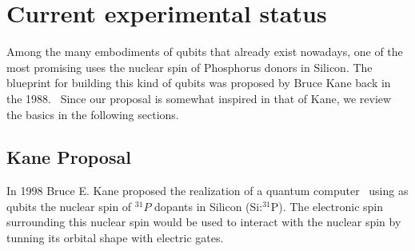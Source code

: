 \chapter{Current experimental status}
Among the many embodiments of qubits that already exist nowadays, one of the most promising uses the nuclear spin of Phosphorus donors in Silicon. The blueprint for building this kind of qubits was proposed by Bruce Kane back in the 1988.~\cite{Kane1988} Since our proposal is somewhat inspired in that of Kane, we review the basics in the following sections.



\section{Kane Proposal}
In 1998 Bruce E. Kane proposed the realization of a quantum computer~\cite{Kane1988} using as qubits the nuclear spin of $^{31}P$ dopants in Silicon (Si:$^{31}$P).
The electronic spin surrounding this nuclear spin would be used to interact with the nuclear spin by tunning its orbital shape with electric gates.

